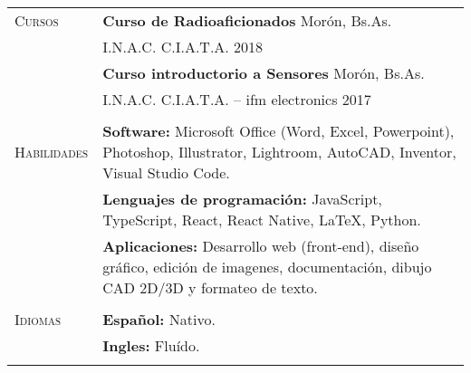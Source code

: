 \documentclass[12pt]{article}
\begin{document}
\begin{tabular}[t]{@{}p{1.15in} @{}p{5.35in}}
   {\scshape Cursos}
   &
   \textbf{Curso de Radioaficionados}  \hfill Morón, Bs.As.\vspace{0.015in} \\ 
   & I.N.A.C. C.I.A.T.A. \hfill 2018\vspace{0.015in}
   \vspace{0.5\baselineskip}
   \\
   & \textbf{Curso introductorio a Sensores}  \hfill Morón, Bs.As.\vspace{0.015in} \\ &
   I.N.A.C. C.I.A.T.A. -- ifm electronics \hfill 2017\vspace{0.015in}
   \\
   \vspace{1\baselineskip}
   \\

   {\scshape Habilidades}
   &
   \textbf{Software: }  Microsoft Office (Word, Excel, Powerpoint), Photoshop, Illustrator, Lightroom, AutoCAD, Inventor, Visual Studio Code.
   \vspace{0.5\baselineskip}
   \\
   &
   \textbf{Lenguajes de programación: }  JavaScript, TypeScript, React, React Native, LaTeX, Python.
   \vspace{0.5\baselineskip}
   \\
   &
   \textbf{Aplicaciones: }  Desarrollo web (front-end), diseño gráfico, edición de imagenes, documentación, dibujo CAD 2D/3D y formateo de texto.
   \\
   \vspace{1\baselineskip}
   \\


   {\scshape Idiomas}
   &
   \textbf{Español: }  Nativo.
   \vspace{0.5\baselineskip}
   \\
   &
   \textbf{Ingles: }  Fluído.
   \\
   \vspace{1\baselineskip}
   \\
   

   \end{tabular}
\end{document}
